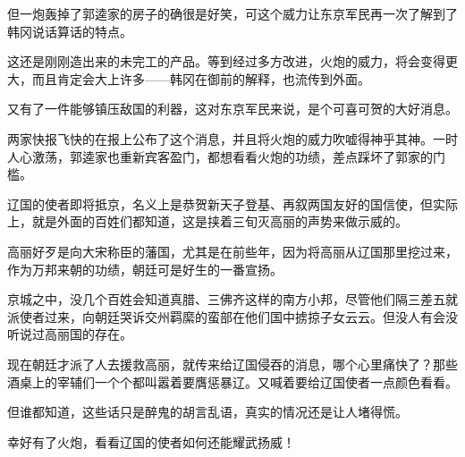 但一炮轰掉了郭逵家的房子的确很是好笑，可这个威力让东京军民再一次了解到了韩冈说话算话的特点。

这还是刚刚造出来的未完工的产品。等到经过多方改进，火炮的威力，将会变得更大，而且肯定会大上许多——韩冈在御前的解释，也流传到外面。

又有了一件能够镇压敌国的利器，这对东京军民来说，是个可喜可贺的大好消息。

两家快报飞快的在报上公布了这个消息，并且将火炮的威力吹嘘得神乎其神。一时人心激荡，郭逵家也重新宾客盈门，都想看看火炮的功绩，差点踩坏了郭家的门槛。

辽国的使者即将抵京，名义上是恭贺新天子登基、再叙两国友好的国信使，但实际上，就是外面的百姓们都知道，这是挟着三旬灭高丽的声势来做示威的。

高丽好歹是向大宋称臣的藩国，尤其是在前些年，因为将高丽从辽国那里挖过来，作为万邦来朝的功绩，朝廷可是好生的一番宣扬。

京城之中，没几个百姓会知道真腊、三佛齐这样的南方小邦，尽管他们隔三差五就派使者过来，向朝廷哭诉交州羁縻的蛮部在他们国中掳掠子女云云。但没人有会没听说过高丽国的存在。

现在朝廷才派了人去援救高丽，就传来给辽国侵吞的消息，哪个心里痛快了？那些酒桌上的宰辅们一个个都叫嚣着要膺惩暴辽。又喊着要给辽国使者一点颜色看看。

但谁都知道，这些话只是醉鬼的胡言乱语，真实的情况还是让人堵得慌。

幸好有了火炮，看看辽国的使者如何还能耀武扬威！

